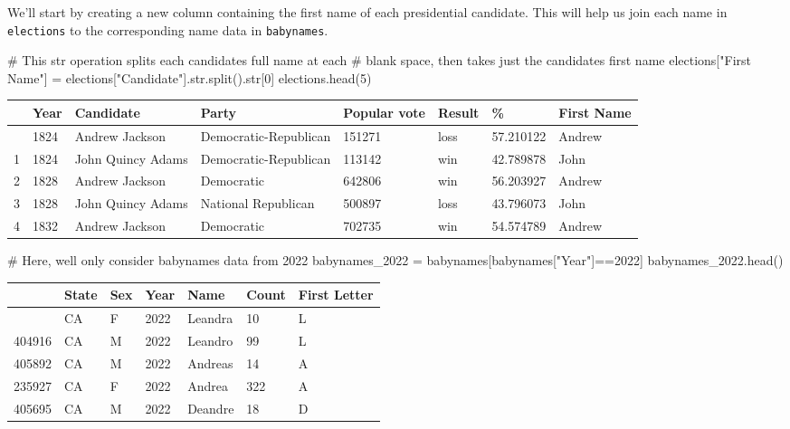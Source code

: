 \documentclass[
  letterpaper,
  DIV=11,
  numbers=noendperiod]{scrreprt}
\newenvironment{Shaded}{\begin{snugshade}}{\end{snugshade}}
\newcommand{\BuiltInTok}[1]{\textcolor[rgb]{0.00,0.23,0.31}{#1}}
\newcommand{\CommentTok}[1]{\textcolor[rgb]{0.37,0.37,0.37}{#1}}
\newcommand{\DecValTok}[1]{\textcolor[rgb]{0.68,0.00,0.00}{#1}}
\newcommand{\NormalTok}[1]{\textcolor[rgb]{0.00,0.23,0.31}{#1}}
\newcommand{\OperatorTok}[1]{\textcolor[rgb]{0.37,0.37,0.37}{#1}}
\newcommand{\StringTok}[1]{\textcolor[rgb]{0.13,0.47,0.30}{#1}}
\begin{document}
We'll start by creating a new column containing the first name of each
presidential candidate. This will help us join each name in
\texttt{elections} to the corresponding name data in \texttt{babynames}.

\begin{Shaded}
\begin{Highlighting}[]
\CommentTok{\# This \textasciigrave{}str\textasciigrave{} operation splits each candidate\textquotesingle{}s full name at each }
\CommentTok{\# blank space, then takes just the candidate\textquotesingle{}s first name}
\NormalTok{elections[}\StringTok{"First Name"}\NormalTok{] }\OperatorTok{=}\NormalTok{ elections[}\StringTok{"Candidate"}\NormalTok{].}\BuiltInTok{str}\NormalTok{.split().}\BuiltInTok{str}\NormalTok{[}\DecValTok{0}\NormalTok{]}
\NormalTok{elections.head(}\DecValTok{5}\NormalTok{)}
\end{Highlighting}
\end{Shaded}

\begin{longtable}[]{@{}llllllll@{}}
\toprule\noalign{}
& Year & Candidate & Party & Popular vote & Result & \% & First Name \\
\midrule\noalign{}
\endhead
\bottomrule\noalign{}
\endlastfoot
0 & 1824 & Andrew Jackson & Democratic-Republican & 151271 & loss &
57.210122 & Andrew \\
1 & 1824 & John Quincy Adams & Democratic-Republican & 113142 & win &
42.789878 & John \\
2 & 1828 & Andrew Jackson & Democratic & 642806 & win & 56.203927 &
Andrew \\
3 & 1828 & John Quincy Adams & National Republican & 500897 & loss &
43.796073 & John \\
4 & 1832 & Andrew Jackson & Democratic & 702735 & win & 54.574789 &
Andrew \\
\end{longtable}

\begin{Shaded}
\begin{Highlighting}[]
\CommentTok{\# Here, we\textquotesingle{}ll only consider \textasciigrave{}babynames\textasciigrave{} data from 2022}
\NormalTok{babynames\_2022 }\OperatorTok{=}\NormalTok{ babynames[babynames[}\StringTok{"Year"}\NormalTok{]}\OperatorTok{==}\DecValTok{2022}\NormalTok{]}
\NormalTok{babynames\_2022.head()}
\end{Highlighting}
\end{Shaded}

\begin{longtable}[]{@{}lllllll@{}}
\toprule\noalign{}
& State & Sex & Year & Name & Count & First Letter \\
\midrule\noalign{}
\endhead
\bottomrule\noalign{}
\endlastfoot
237964 & CA & F & 2022 & Leandra & 10 & L \\
404916 & CA & M & 2022 & Leandro & 99 & L \\
405892 & CA & M & 2022 & Andreas & 14 & A \\
235927 & CA & F & 2022 & Andrea & 322 & A \\
405695 & CA & M & 2022 & Deandre & 18 & D \\
\end{longtable}
\end{document}
